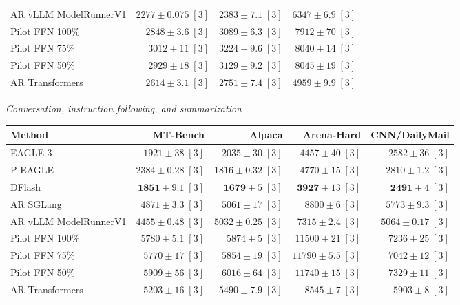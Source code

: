 \begin{table}[!htp]
\begin{tabular}{@{}>{\raggedright\arraybackslash}p{3.7cm}rrr@{}}
AR \textperiodcentered{} vLLM ModelRunnerV1 & \(2277 \pm 0.075\;[3]\) & \(2383 \pm 7.1\;[3]\) & \(6347 \pm 6.9\;[3]\) \\
Pilot FFN 100\% & \(2848 \pm 3.6\;[3]\) & \(3089 \pm 6.3\;[3]\) & \(7912 \pm 70\;[3]\) \\
Pilot FFN 75\% & \(3012 \pm 11\;[3]\) & \(3224 \pm 9.6\;[3]\) & \(8040 \pm 14\;[3]\) \\
Pilot FFN 50\% & \(2929 \pm 18\;[3]\) & \(3129 \pm 9.2\;[3]\) & \(8045 \pm 19\;[3]\) \\
AR \textperiodcentered{} Transformers & \(2614 \pm 3.1\;[3]\) & \(2751 \pm 7.4\;[3]\) & \(4959 \pm 9.9\;[3]\) \\
\bottomrule
\end{tabular}\par\medskip
\textit{Conversation, instruction following, and summarization}\par\smallskip
\begin{tabular}{@{}>{\raggedright\arraybackslash}p{3.7cm}rrrr@{}}
\toprule
Method & MT-Bench & Alpaca & Arena-Hard & CNN/DailyMail \\
\midrule
EAGLE-3 & \(1921 \pm 38\;[3]\) & \(2035 \pm 30\;[3]\) & \(4457 \pm 40\;[3]\) & \(2582 \pm 36\;[3]\) \\
P-EAGLE & \(2384 \pm 0.28\;[3]\) & \(1816 \pm 0.32\;[3]\) & \(4770 \pm 15\;[3]\) & \(2810 \pm 1.2\;[3]\) \\
DFlash & \(\mathbf{1851} \pm 9.1\;[3]\) & \(\mathbf{1679} \pm 5\;[3]\) & \(\mathbf{3927} \pm 13\;[3]\) & \(\mathbf{2491} \pm 4\;[3]\) \\
AR \textperiodcentered{} SGLang & \(4871 \pm 3.3\;[3]\) & \(5061 \pm 17\;[3]\) & \(8800 \pm 6\;[3]\) & \(5773 \pm 9.3\;[3]\) \\
AR \textperiodcentered{} vLLM ModelRunnerV1 & \(4455 \pm 0.48\;[3]\) & \(5032 \pm 0.25\;[3]\) & \(7315 \pm 2.4\;[3]\) & \(5064 \pm 0.17\;[3]\) \\
Pilot FFN 100\% & \(5780 \pm 5.1\;[3]\) & \(5874 \pm 5\;[3]\) & \(11500 \pm 21\;[3]\) & \(7236 \pm 25\;[3]\) \\
Pilot FFN 75\% & \(5770 \pm 17\;[3]\) & \(5854 \pm 19\;[3]\) & \(11790 \pm 5.5\;[3]\) & \(7042 \pm 12\;[3]\) \\
Pilot FFN 50\% & \(5909 \pm 56\;[3]\) & \(6016 \pm 64\;[3]\) & \(11740 \pm 15\;[3]\) & \(7329 \pm 11\;[3]\) \\
AR \textperiodcentered{} Transformers & \(5203 \pm 16\;[3]\) & \(5490 \pm 7.9\;[3]\) & \(8545 \pm 7\;[3]\) & \(5903 \pm 8\;[3]\) \\

\end{tabular}
\end{table}
